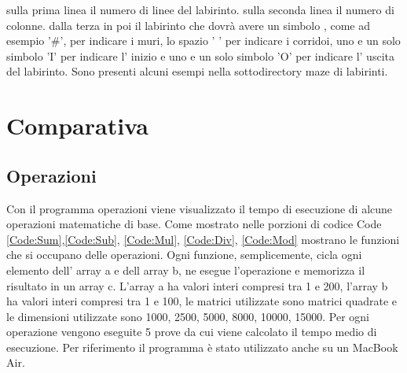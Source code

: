 \documentclass[12pt,a4paper]{report}
\begin{document}
sulla prima linea il numero di linee del labirinto.
sulla seconda linea il numero di colonne.
dalla terza in poi il labirinto che dovrà avere un simbolo , come ad esempio '\#', per indicare i muri, lo spazio ' ' per indicare i corridoi, uno e un solo simbolo 'I' per indicare l' inizio e uno e un solo simbolo 'O' per indicare l' uscita del labirinto.
Sono presenti alcuni esempi nella sottodirectory maze di labirinti.


\chapter{Comparativa}

\section{Operazioni}
	Con il programma operazioni viene visualizzato il tempo di esecuzione di alcune operazioni matematiche di base. Come mostrato nelle porzioni di codice Code \ref{Code:Sum},\ref{Code:Sub}, \ref{Code:Mul}, \ref{Code:Div}, \ref{Code:Mod} mostrano le funzioni che si occupano delle operazioni. Ogni funzione, semplicemente, cicla ogni elemento dell' array a e dell array b, ne esegue l'operazione e memorizza il risultato in un array c. L'array a ha valori interi compresi tra 1 e 200, l'array b ha valori interi compresi tra 1 e 100,  le matrici utilizzate sono matrici quadrate e le dimensioni utilizzate sono 1000, 2500, 5000, 8000, 10000, 15000. Per ogni operazione vengono eseguite 5 prove da cui viene calcolato il tempo medio di esecuzione. 
	Per riferimento il programma è stato utilizzato anche su un MacBook Air. 
	
	
	
	
	
	
	
\end{document}

